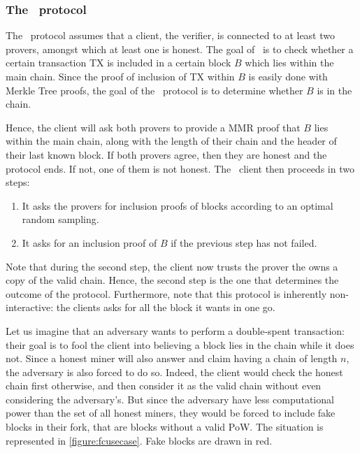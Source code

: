         \subsubsection{The \FC\ protocol}
            The \FC\ protocol assumes that a client, the verifier, is connected to at least two provers, amongst which at least one is honest. The goal of \FC\ is to check whether a certain transaction TX is included in a certain block \(B\) which lies within the main chain. Since the proof of inclusion of TX within \(B\) is easily done with Merkle Tree proofs, the goal of the \FC\ protocol is to determine whether \(B\) is in the chain.
          
            Hence, the client will ask both provers to provide a MMR proof that \(B\) lies within the main chain, along with the length of their chain and the header of their last known block. If both provers agree, then they are honest and the protocol ends. If not, one of them is not honest. The \FC\ client then proceeds in two steps:
          
            \begin{enumerate}
                \item It asks the provers for inclusion proofs of blocks according to an optimal random sampling.
                \item It asks for an inclusion proof of \(B\) if the previous step has not failed.
            \end{enumerate}
          
            Note that during the second step, the client now trusts the prover the owns a copy of the valid chain. Hence, the second step is the one that determines the outcome of the protocol. Furthermore, note that this protocol is inherently non-interactive: the clients asks for all the block it wants in one go.
          
            Let us imagine that an adversary wants to perform a double-spent transaction: their goal is to fool the client into believing a block lies in the chain while it does not. Since a honest miner will also answer and claim having a chain of length \(n\), the adversary is also forced to do so. Indeed, the client would check the honest chain first otherwise, and then consider it as the valid chain without even considering the adversary's. But since the adversary have less computational power than the set of all honest miners, they would be forced to include fake blocks in their fork, that are blocks without a valid PoW. The situation  is represented in \autoref{figure:fcusecase}. Fake blocks are drawn in red.
          
